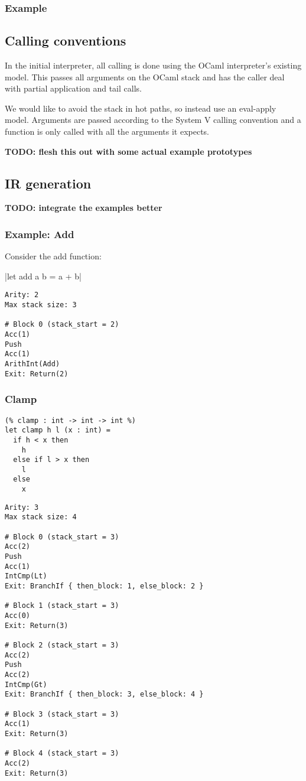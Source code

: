 \subsubsection{Example}

\subsection{Calling conventions}

In the initial interpreter, all calling is done using the OCaml interpreter's existing model. This
passes all arguments on the OCaml stack and has the caller deal with partial application and tail
calls.

We would like to avoid the stack in hot paths, so instead use an eval-apply model. Arguments are
passed according to the System V calling convention and a function is only called with all the
arguments it expects.

\textbf{TODO: flesh this out with some actual example prototypes}

\subsection{IR generation} \label{opt-irgen}

\textbf{TODO: integrate the examples better}

\subsubsection{Example: Add}

Consider the add function:

|let add a b = a + b|

\begin{verbatim}
Arity: 2
Max stack size: 3

# Block 0 (stack_start = 2)
Acc(1)
Push
Acc(1)
ArithInt(Add)
Exit: Return(2)
\end{verbatim}

\subsubsection{Clamp}

\begin{verbatim}
(% clamp : int -> int -> int %)
let clamp h l (x : int) =
  if h < x then
    h
  else if l > x then
    l
  else
    x
\end{verbatim}

\begin{verbatim}
Arity: 3
Max stack size: 4

# Block 0 (stack_start = 3)
Acc(2)
Push
Acc(1)
IntCmp(Lt)
Exit: BranchIf { then_block: 1, else_block: 2 }

# Block 1 (stack_start = 3)
Acc(0)
Exit: Return(3)

# Block 2 (stack_start = 3)
Acc(2)
Push
Acc(2)
IntCmp(Gt)
Exit: BranchIf { then_block: 3, else_block: 4 }

# Block 3 (stack_start = 3)
Acc(1)
Exit: Return(3)

# Block 4 (stack_start = 3)
Acc(2)
Exit: Return(3)
\end{verbatim}

